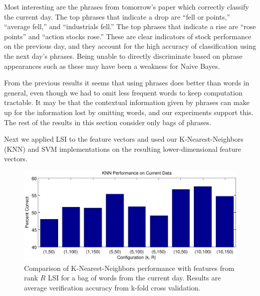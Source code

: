 \documentclass[10pt, twocolumn]{article}
\begin{document}
Most interesting are the phrases from tomorrow's paper which correctly classify the current day. The top phrases that indicate a drop are ``fell or points,'' ``average fell,'' and ``industrials fell.'' The top phrases that indicate a rise are ``rose points'' and ``action stocks rose.'' These are clear indicators of stock performance on the previous day, and they account for the high accuracy of classification using the next day's phrases. Being unable to directly discriminate based on phrase appearances such as these may have been a weakness for Naive Bayes.


From the previous results it seems that using phrases does better than words in general, even though we had to omit less frequent words to keep computation tractable. It may be that the contextual information given by phrases can make up for the information lost by omitting words, and our experiments support this. The rest of the results in this section consider only bags of phrases.

Next we applied LSI to the feature vectors and used our K-Nearest-Neighbors (KNN) and SVM implementations on the resulting lower-dimensional feature vectors.

\begin{figure}[h]
\centering
\includegraphics[scale=0.5]{plots/knn-today.pdf}
\caption{Comparison of K-Nearest-Neighbors performance with features from rank $R$ LSI for a bag of words from the current day. Results are average verification accuracy from k-fold cross validation.}
\label{fig:knncompare}
\end{figure}
\end{document}
